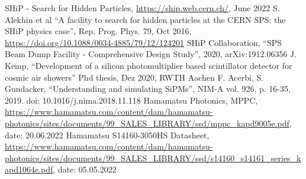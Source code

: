 \documentclass[listof=totoc,bibliography=totocnumbered,a4paper,english,12pt,twoside]{report}
\begin{document}
\newpage
\listoffigures

\newpage

\listoftables
\newpage

\begin{thebibliography}{9}
 SHiP - Search for Hidden Particles, \url{https://ship.web.cern.ch/}, June 2022
 S. Alekhin et al ``A facility to search for hidden particles at the CERN SPS: the SHiP physics case'', Rep. Prog. Phys. 79, Oct 2016, \url{https://doi.org/10.1088/0034-4885/79/12/124201}
 SHiP Collaboration, ``SPS Beam Dump Facility - Comprehensive Design Study'', 2020, arXiv:1912.06356
 J. Kemp, ``Development of a silicon photomultiplier based scintillator detector for cosmic air showers'' Phd thesis, Dez 2020, RWTH Aachen
 F. Acerbi, S. Gundacker, ``Understanding and simulating SiPMs'', NIM-A vol. 926, p. 16-35, 2019. doi: 10.1016/j.nima.2018.11.118
 Hamamatsu Photonics, MPPC, \url{https://www.hamamatsu.com/content/dam/hamamatsu-photonics/sites/documents/99_SALES_LIBRARY/ssd/mppc_kapd9005e.pdf}, date: 20.06.2022
 Hamamatsu S14160-3050HS Datasheet,
\url{https://www.hamamatsu.com/content/dam/hamamatsu-photonics/sites/documents/99_SALES_LIBRARY/ssd/s14160_s14161_series_kapd1064e.pdf}, date: 05.05.2022
\end{thebibliography}
\end{document}

